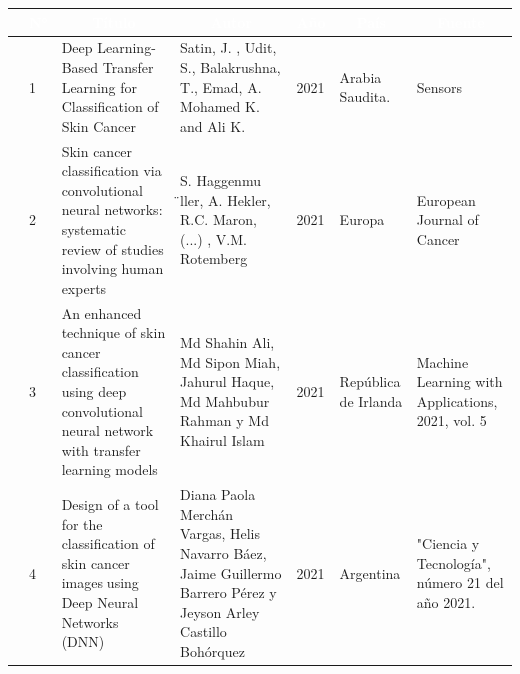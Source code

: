 \begin{table}[h]
	\newcommand{\multirot}[1]{\multirow{2}{*}[-8ex]{\rotcell{\rlap{#1}}}}
	\footnotesize
	\centering
	\begin{tabular}{|m{0.5cm}|m{0.3cm}|m{4cm}|m{2cm}|m{0.6cm}|m{1.7cm}|m{3cm}|} 
		\hline
		\rowcolor[rgb]{0,0.251,0.502} \multicolumn{1}{|c|}{\textcolor{white}{Tipo}} & \multicolumn{1}{c|}{\textcolor{white}{N°}} & \multicolumn{1}{c|}{\textcolor{white}{Título}}                                                                             & \multicolumn{1}{c|}{\textcolor{white}{Autor}}        & \multicolumn{1}{c|}{\textcolor{white}{Año}} & \multicolumn{1}{c|}{\textcolor{white}{País}} & \multicolumn{1}{c|}{\textcolor{white}{Fuente}}                                                        \\ 
		\hline
		\multirot{Problema}                                        & 1                                             & Deep Learning-Based Transfer Learning for Classification of Skin Cancer~                                                                               & Satin, J. , Udit, S., Balakrushna, T., Emad, A. Mohamed K. and Ali K. & 2021 &  Arabia Saudita. & Sensors \\ 
		\cline{2-7}
		& 2                                             & Skin cancer classification via convolutional neural networks: systematic review of studies involving human experts                                                          & S. Haggenmu ̈ller, A. Hekler, R.C. Maron,  (...) ,  V.M. Rotemberg                 & 2021                                        & Europa                                 & European Journal of Cancer                                                \\ 
		\hline
		\multirow{3}{*}[-14ex]{\rotcell{\rlap{Propuesta}}}
		& 3                                             & An enhanced technique of skin cancer classification using deep convolutional neural network with transfer learning models~                                                                               & Md Shahin Ali, Md Sipon Miah, Jahurul Haque, Md Mahbubur Rahman y Md Khairul Islam                                 & 2021                                        &  República de Irlanda         & Machine Learning with Applications, 2021, vol. 5                                                                  \\ 
		\cline{2-7}
		& 4                                             & Design of a tool for the classification of skin cancer imagesusing Deep Neural Networks (DNN)~                                                                                & Diana Paola Merchán Vargas, Helis Navarro Báez, Jaime Guillermo Barrero Pérez y Jeyson Arley Castillo Bohórquez                                          & 2021                                        & Argentina                                          & "Ciencia y Tecnología", número 21 del año 2021.                                                            \\ 
		

\end{tabular}
\end{table}
